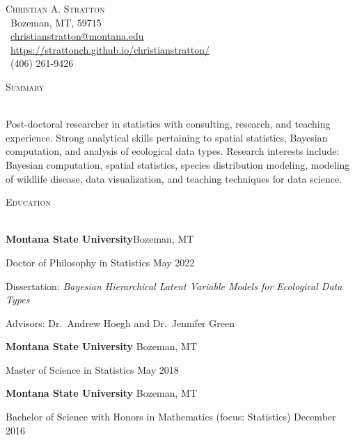 \documentclass[a4paper]{article}
\newcommand{\lineunder} {
	\vspace*{-8pt} \\
	\hspace*{-18pt} \hrulefill \\
}
\newcommand{\header} [1] {
	{\hspace*{-18pt}\vspace*{6pt} \textsc{#1}}
	\vspace*{-6pt} \lineunder
}
\begin{document}
\vspace*{-40pt}
\vspace*{-10pt}
\begin{center}
{\Huge \scshape {Christian A. Stratton}} \\
\faMapMarker \ Bozeman, MT, 59715 \\
\faEnvelope \ \href{mailto:christianstratton@montana.edu}{christianstratton@montana.edu} \\ 
\faGlobe \ \href{https://strattonch.github.io/christianstratton/}{https://strattonch.github.io/christianstratton/} \\
\faPhone \ (406) 261-9426 \\ 
\end{center}
\vspace*{2mm}

\header{Summary}
\vspace*{2mm}

Post-doctoral researcher in statistics with consulting, research, and
teaching experience. Strong analytical skills pertaining to spatial
statistics, Bayesian computation, and analysis of ecological data types.
Research interests include: Bayesian computation, spatial statistics,
species distribution modeling, modeling of wildlife disease, data
visualization, and teaching techniques for data science.

\header{Education}
\vspace*{2mm}

\textbf{Montana State University}\hfill Bozeman, MT

Doctor of Philosophy in Statistics \hfill May 2022

Dissertation:
\textit{Bayesian Hierarchical Latent Variable Models for Ecological Data Types}

Advisors: Dr.~Andrew Hoegh and Dr.~Jennifer Green

\vspace{2mm}

\textbf{Montana State University} \hfill Bozeman, MT

Master of Science in Statistics \hfill May 2018

\vspace{2mm}

\textbf{Montana State University} \hfill Bozeman, MT

Bachelor of Science with Honors in Mathematics (focus: Statistics)
\hfill December 2016

\vspace{2mm}
\end{document}
